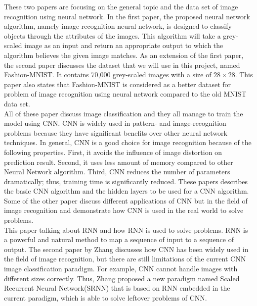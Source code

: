 \documentclass[letterpaper]{article} %
\begin{document}
\cite{cios1995image,xiao2017fashion} These two papers are focusing on the general topic and the data set of image recognition using neural network. In the first paper, the proposed neural network algorithm, namely image recognition neural network, is designed to classify objects through the attributes of the images. This algorithm will take a grey-scaled image as an input and return an appropriate output to which the algorithm believes the given image matches. As an extension of the first paper, the second paper discusses the dataset that we will use in this project, named Fashion-MNIST. It contains 70,000 grey-scaled images with a size of $28 \times 28$. This paper also states that Fashion-MNIST is considered as a better dataset for problem of image recognition using neural network compared to the old MNIST data set. \\
\cite{simonyan2015very,hijazi2015using,razavian2014cnn,chen2018the,hou2016fruit,lo1995artificial}
All of these paper discuss image classification and they all manage to train the model using CNN. CNN is widely used in pattern- and image-recognition problems because they have significant benefits over other neural network techniques. In general, CNN is a good choice for image recognition because of the following properties. First, it avoids the influence of image distortion on prediction result. Second, it uses less amount of memory compared to other Neural Network algorithm. Third, CNN reduces the number of parameters dramatically; thus, training time is significantly reduced. These papers describes the basic CNN algorithm and the hidden layers to be used for a CNN algorithm. Some of the other paper discuss different applications of CNN but in the field of image recognition and demonstrate how CNN is used in the real world to solve problems. \\
\cite{le2015a,zhang2018image} This paper talking about RNN and how RNN is used to solve problems. RNN is a powerful and natural method to map a sequence of input to a sequence of output. The second paper by Zhang discusses how CNN has been widely used in the field of image recognition, but there are still limitations of the current CNN image classification paradigm. For example, CNN cannot handle images with different sizes correctly. Thus, Zhang proposed a new paradigm named Scaled Recurrent Neural Network(SRNN) that is based on RNN embedded in the current paradigm, which is able to solve leftover problems of CNN.

\end{document}
